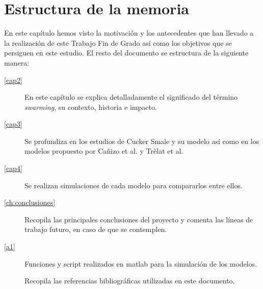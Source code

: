 \section{Estructura de la memoria}\label{s1_4}
En este capítulo hemos visto la motivación y los antecedentes que han llevado a la realización de este Trabajo Fin de Grado así como los objetivos que se persiguen en este estudio. El resto del documento se estructura de la siguiente manera:

\begin{description}
    \item[\autoref{cap2}] En este capítulo se explica detalladamente el significado del término \textit{swarming}, su contexto, historia e impacto.
    \item[\autoref{cap3}] Se profundiza en los estudios de Cucker Smale y su modelo así como en los modelos propuesto por Cañizo et al. y Trèlat et al.
    \item[\autoref{cap4}] Se realizan simulaciones de cada modelo para compararlos entre ellos. 
    \item[\autoref{ch:conclusiones}] Recopila las principales conclusiones del proyecto y comenta las líneas de trabajo futuro, en caso de que se contemplen.
    \item[\autoref{a1}] Funciones y script realizados en matlab para la simulación de los modelos.
    \item[] Recopila las referencias bibliográficas utilizadas en este documento.
\end{description}
